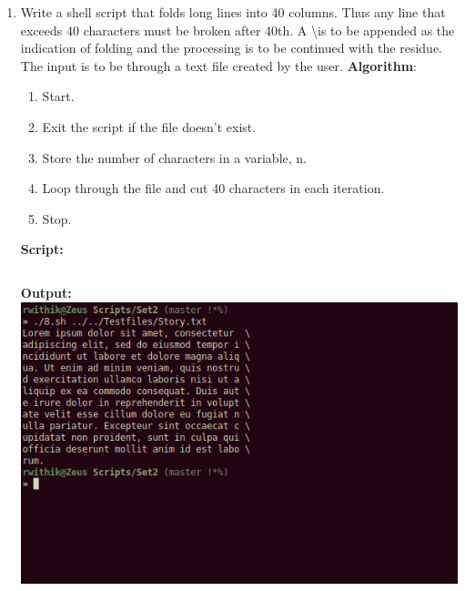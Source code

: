 \documentclass[10pt,a4paper,titlepage]{report}
\begin{document}
\begin{enumerate}
\item Write a shell script that folds long lines into 40 columns. Thus any line that exceeds 40 characters must be broken after 40th. A \textbackslash  is to be appended as the indication of folding and the processing is to be continued with the residue. The input is to be through a text file created by the user. \newline
\textbf{Algorithm}:\newline
\begin{enumerate}
	\item Start.
	\item Exit the script if the file doesn't exist.
	\item Store the number of characters in a variable, n.
	\item Loop through the file and cut 40 characters in each iteration.
	\item Stop.
\end{enumerate}
\newline
\textbf{Script:}\newline
\inputminted{bash}{../Scripts/Set2/8.sh}
\newline
\textbf{Output:}\newline
\includegraphics[width=\linewidth]{../Images/Shell2/8.png}
\pagebreak


\end{enumerate}
\end{document}
